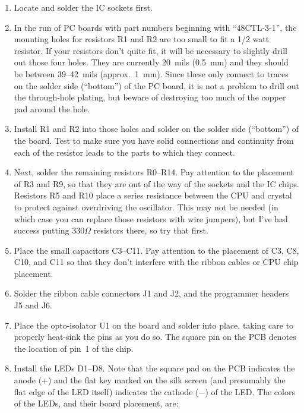 \documentclass[12pt]{article}
\begin{document}
\begin{enumerate}
 \item Locate and solder the IC sockets first.
 \item In the run of PC boards with part numbers beginning with ``48CTL-3-1'',
       the mounting holes for resistors R1 and R2 are too small to fit a 1/2 watt
       resistor.  If your resistors don't quite fit, it will be necessary to slightly
       drill out those four holes.  They are currently 20~mils (0.5~mm) and they
       should be between 39--42~mils (approx.\ 1~mm).  Since these only connect to
       traces on the solder side (``bottom'') of the PC board, it is not a problem 
       to drill out the through-hole plating, but beware of destroying too much
       of the copper pad around the hole.  
 \item Install R1 and R2 into those holes and solder on the solder side (``bottom'') 
       of the board.  Test to make sure you have solid connections and continuity from
       each of the resistor leads to the parts to which they connect.
 \item Next, solder the remaining resistors R0--R14.  Pay attention to the placement of
       R3 and R9, so that they are out of the way of the sockets and the IC
       chips.  Resistors R5 and R10 place a series resistance between the CPU
       and crystal to protect against overdriving the oscillator.  
       This may not be needed (in which case you can replace
       those resistors with wire jumpers), but I've had success putting 
       $330\Omega$ resistors there, so try that first.
 \item Place the small capacitors C3--C11.  Pay attention to the placement of 
       C3, C8, C10, and C11 so that they don't interfere with the ribbon
       cables or CPU chip placement.
 \item Solder the ribbon cable connectors J1 and J2, and the programmer
       headers J5 and J6.
 \item Place the opto-isolator U1 on the board and solder into place, taking
       care to properly heat-sink the pins as you do so.
       The square pin on the PCB denotes the location of pin~1 of the chip.
 \item Install the LEDs D1--D8.  Note that the square pad on the PCB
       indicates the anode (+) and the flat key marked on the silk screen
	   (and presumably the flat edge of the LED itself) indicates the cathode
	   ($-$) of the LED.  The colors of the LEDs, and their board placement, are:
	   \begin{center}

\end{center}
\end{enumerate}
\end{document}

